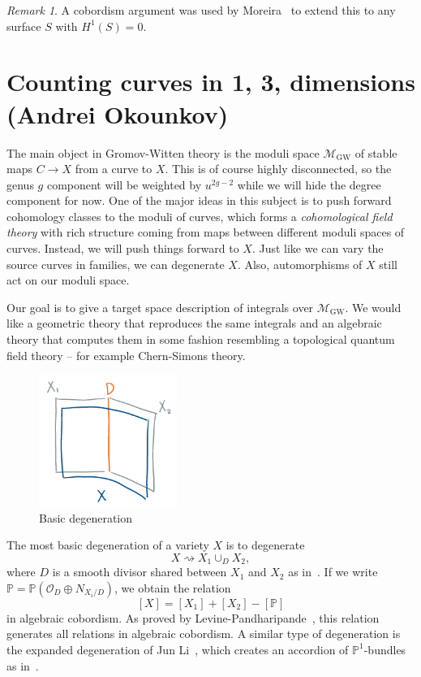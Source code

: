 \documentclass[leqno, openany]{memoir}
\theoremstyle{definition}
\theoremstyle{remark}
\newtheorem{rmk}[thm]{Remark}
\theoremstyle{plain}
\theoremstyle{definition}
\theoremstyle{remark}
\renewcommand{\P}{\mathbb{P}}
\newcommand{\mc}[1]{\mathcal{#1}}
\newcommand{\mr}[1]{\mathrm{#1}}
\begin{document}
\begin{rmk}
A cobordism argument was used by Moreira~\cite{moreira} to extend this to any surface $S$ with $H^1(S) = 0$.
\end{rmk}


\chapter{Counting curves in 1, 3,  dimensions (Andrei Okounkov)}%
\label{cha:andrei}

The main object in Gromov-Witten theory is the moduli space $\mc{M}_{\mr{GW}}$ of stable maps $C \to X$ from a curve to $X$. This is of course highly disconnected, so the genus $g$ component will be weighted by $u^{2g-2}$ while we will hide the degree component for now. One of the major ideas in this subject is to push forward cohomology classes to the moduli of curves, which forms a \textit{cohomological field theory} with rich structure coming from maps between different moduli spaces of curves. Instead, we will push things forward to $X$. Just like we can vary the source curves in families, we can degenerate $X$. Also, automorphisms of $X$ still act on our moduli space.

Our goal is to give a target space description of integrals over $\mc{M}_{\mr{GW}}$. We would like a geometric theory that reproduces the same integrals and an algebraic theory that computes them in some fashion resembling a topological quantum field theory -- for example Chern-Simons theory.

\begin{figure}[h]
    \centering
    \includegraphics[width=0.4\textwidth]{basicdeg}
    \caption{Basic degeneration}
    \label{fig:basicdeg}
\end{figure}

The most basic degeneration of a variety $X$ is to degenerate 
\[ X \rightsquigarrow X_1 \cup_D X_2, \] 
where $D$ is a smooth divisor shared between $X_1$ and $X_2$ as in~. If we write $\P = \P(\mc{O}_D \oplus N_{X_i/D})$, we obtain the relation
\[ [X] = [X_1] + [X_2] - [\P] \]
in algebraic cobordism. As proved by Levine-Pandharipande~\cite{algcob}, this relation generates all relations in algebraic cobordism. A similar type of degeneration is the expanded degeneration of Jun Li~\cite{expdeg}, which creates an accordion of $\P^1$-bundles as in~.
\end{document}
